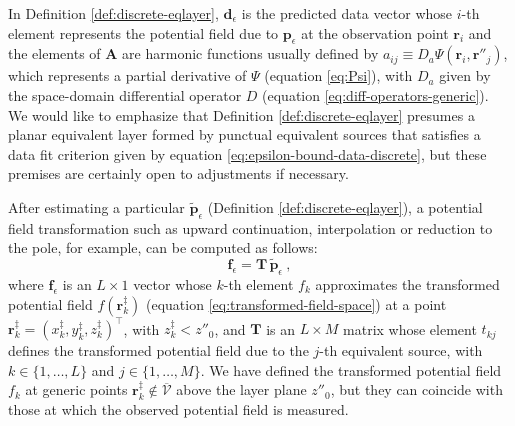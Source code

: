 In Definition \ref{def:discrete-eqlayer}, $\mathbf{d}_{\epsilon}$ is the predicted data vector whose 
$i$-th element represents the potential field due to $\mathbf{p}_{\epsilon}$ at the observation point $\mathbf{r}_{i}$ 
and the elements of $\mathbf{A}$ are harmonic functions usually defined by 
$a_{ij} \equiv D_{a} \Psi(\mathbf{r}_{i}, \mathbf{r}''_{j})$, which represents a 
partial derivative of $\Psi$ (equation \ref{eq:Psi}), with $D_{a}$ given by the space-domain differential operator 
$D$ (equation \ref{eq:diff-operators-generic}). 
We would like to emphasize that Definition \ref{def:discrete-eqlayer} presumes a planar equivalent layer formed 
by punctual equivalent sources that satisfies a data fit criterion given by equation \ref{eq:epsilon-bound-data-discrete}, 
but these premises are certainly open to adjustments if necessary.

After estimating a particular $\tilde{\mathbf{p}}_{\epsilon}$ (Definition \ref{def:discrete-eqlayer}), 
a potential field transformation such as upward continuation, 
interpolation or reduction to the pole, for example, can be computed as follows:
\begin{equation}
	\mathbf{f}_{\epsilon} = \mathbf{T} \, \tilde{\mathbf{p}}_{\epsilon} \: ,
	\label{eq:transformed-field-layer-space} 
\end{equation}
where $\mathbf{f}_{\epsilon}$ is an $L \times 1$ vector whose $k$-th element $f_{k}$ approximates 
the transformed potential field $f(\mathbf{r}^{\ddagger}_{k})$ (equation \ref{eq:transformed-field-space}) 
at a point $\mathbf{r}^{\ddagger}_{k} = (x^{\ddagger}_{k}, y^{\ddagger}_{k}, z^{\ddagger}_{k})^{\top}$, 
with $z^{\ddagger}_{k} < z''_{0}$, and $\mathbf{T}$ is an 
$L \times M$ matrix whose element $t_{kj}$ defines the transformed
potential field due to the $j$-th equivalent source, with $k \in \{ 1, \dots, L \}$ and
$j \in \{ 1, \dots, M \}$. 
We have defined the transformed potential field $f_{k}$ at generic points 
$\mathbf{r}^{\ddagger}_{k} \notin \overline{\mathcal{V}}$ above the layer plane $z''_{0}$, but they 
can coincide with those at which the observed potential field is measured. 

